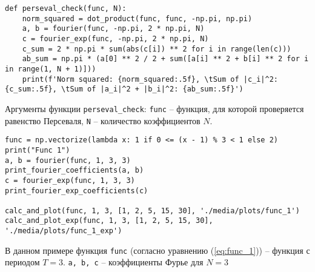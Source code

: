\begin{lstlisting}[style=python_white, caption=Функция для проверки равенства Персеваля, label=lst:perseval_check]
def perseval_check(func, N):
    norm_squared = dot_product(func, func, -np.pi, np.pi)
    a, b = fourier(func, -np.pi, 2 * np.pi, N)
    c = fourier_exp(func, -np.pi, 2 * np.pi, N)
    c_sum = 2 * np.pi * sum(abs(c[i]) ** 2 for i in range(len(c)))
    ab_sum = np.pi * (a[0] ** 2 / 2 + sum([a[i] ** 2 + b[i] ** 2 for i in range(1, N + 1)]))
    print(f'Norm squared: {norm_squared:.5f}, \tSum of |c_i|^2: {c_sum:.5f}, \tSum of |a_i|^2 + |b_i|^2: {ab_sum:.5f}')
\end{lstlisting}
Аргументы функции \texttt{perseval\_check}: \texttt{func} -- функция, для которой проверяется равенство Персеваля, \texttt{N} -- количество коэффициентов $N$.
\newline


\begin{lstlisting}[style=python_white, caption=Пример работы с функциями, label=lst:example1, belowskip=-0.8\baselineskip]
func = np.vectorize(lambda x: 1 if 0 <= (x - 1) % 3 < 1 else 2)
print("Func 1")
a, b = fourier(func, 1, 3, 3)
print_fourier_coefficients(a, b)
c = fourier_exp(func, 1, 3, 3)
print_fourier_exp_coefficients(c)

calc_and_plot(func, 1, 3, [1, 2, 5, 15, 30], './media/plots/func_1')
calc_and_plot_exp(func, 1, 3, [1, 2, 5, 15, 30], './media/plots/func_1_exp')
\end{lstlisting}
В данном примере функция \texttt{func} (согласно уравнению (\ref{eq:func_1})) -- функция с периодом $T = 3$. 
\texttt{a, b, c} -- коэффициенты Фурье для $N = 3$
\newline

